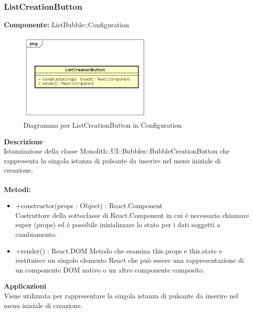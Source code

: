 \subsubsection{ListCreationButton}
\textbf{Componente:}  ListBubble::Configuration\\
   \FloatBarrier
   \begin{figure}[ht]
   \centering
   \includegraphics[width=0.6\textwidth]{img/single-ListCreationButton}
   \caption{{Diagramma per ListCreationButton in Configuration}}
\end{figure}
\FloatBarrier
\textbf{Descrizione}\\
Istanziazione della classe Monolith::UI::Bubbles::BubbleCreationButton che rappresenta la singola istanza di pulsante da inserire nel menu iniziale di creazione.
\\
\\
\textbf{Metodi:} 
\begin{itemize}
\item +constructor(props : Object) : React.Component 
\\
Costruttore della sottoclasse di React.Component in cui è necessario chiamare super (props) ed è possibile inizializzare lo stato per i dati soggetti a cambiamento.

\item +render() : React.DOM
Metodo che esamina this.props e this.state e restituisce un singolo elemento React che può essere una rappresentazione di un componente DOM nativo o un altro componente composito.

\end{itemize} 


\textbf{Applicazioni}\\
Viene utilizzata per rappresentare la singola istanza di pulsante da inserire nel menu iniziale di creazione. 


\clearpage

